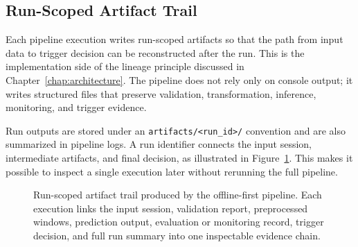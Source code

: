 \subsection{Run-Scoped Artifact Trail}
\label{sec:run_scoped_artifacts}

Each pipeline execution writes run-scoped artifacts so that the path from input data to trigger decision can be reconstructed after the run. This is the implementation side of the lineage principle discussed in Chapter~\ref{chap:architecture}. The pipeline does not rely only on console output; it writes structured files that preserve validation, transformation, inference, monitoring, and trigger evidence.

Run outputs are stored under an \texttt{artifacts/<run\_id>/} convention and are also summarized in pipeline logs. A run identifier connects the input session, intermediate artifacts, and final decision, as illustrated in Figure~\ref{fig:run_scoped_artifact_trail}. This makes it possible to inspect a single execution later without rerunning the full pipeline.

\begin{figure}[htbp]
\centering
{}
\caption[Run-scoped artifact trail produced by the offline-first pipeline]{Run-scoped artifact trail produced by the offline-first pipeline. Each execution links the input session, validation report, preprocessed windows, prediction output, evaluation or monitoring record, trigger decision, and full run summary into one inspectable evidence chain.}
\label{fig:run_scoped_artifact_trail}
\end{figure}
\FloatBarrier

